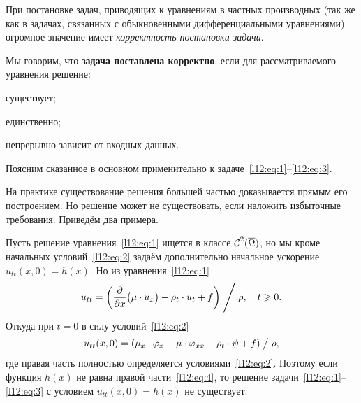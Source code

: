 При постановке задач, приводящих к уравнениям в частных производных (так же как в задачах, связанных с обыкновенными дифференциальными уравнениями) огромное значение имеет \emph{корректность постановки задачи}.
\begin{_def}
	Мы говорим, что \textbf{задача поставлена корректно}, если для рассматриваемого уравнения решение:
	\begin{enumerateD}
		\item существует;
		\item единственно;
		\item непрерывно зависит от входных данных.
	\end{enumerateD} 
\end{_def}
\noindent Поясним сказанное в основном применительно к задаче~\eqref{l12:eq:1}--\eqref{l12:eq:3}.
\begin{enumerateD}
	\item На практике существование решения большей частью доказывается прямым его построением. Но решение может не существовать, если наложить избыточные требования. Приведём два примера.
	\begin{enumerateD}
		\item Пусть решение уравнения~\eqref{l12:eq:1} ищется в классе $\mathcal{C}{\mathstrut}^{2}_{}(\overline{\Omega})$, но мы кроме начальных условий~\eqref{l12:eq:2} задаём дополнительно начальное ускорение $u_{tt}(x,0)=h(x)$. Но из уравнения~\eqref{l12:eq:1}
		\begin{equation*}
			u_{tt}=\left(\frac{\partial}{\partial x}\big(\mu\cdot u_x\big)-\rho_t\cdot u_t+f\right)\Biggm/\rho,\quad t\geqslant0.
		\end{equation*}
		Откуда при $t=0$ в силу условий~\eqref{l12:eq:2}
		\begin{equation}
			\label{l12:eq:4}
			u_{tt}(x,0)=\left(\mu_x\cdot\phi_x+\mu\cdot\phi_{xx}-\rho_t\cdot\psi+f\right)\bigm/\rho,
		\end{equation}
		где правая часть полностью определяется условиями~\eqref{l12:eq:2}. Поэтому если функция $h(x)$ не равна правой части~\eqref{l12:eq:4}, то решение задачи~\eqref{l12:eq:1}--\eqref{l12:eq:3} с условием $u_{tt}(x,0)=h(x)$ не существует.
		

\end{enumerateD}
\end{enumerateD}
